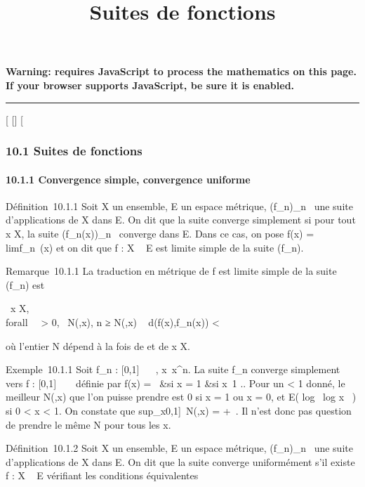 \documentclass[]{article}
\title{Suites de fonctions}
\author{}
\date{}
\begin{document}
\maketitle

\textbf{Warning: 
requires JavaScript to process the mathematics on this page.\\ If your
browser supports JavaScript, be sure it is enabled.}

\begin{center}\rule{3in}{0.4pt}\end{center}

{[}
{[}{]}
{[}

\subsubsection{10.1 Suites de fonctions}

\paragraph{10.1.1 Convergence simple, convergence uniforme}

Définition~10.1.1 Soit X un ensemble, E un espace métrique,
(f_n)_n\in{}~ une suite d'applications de X dans E. On dit
que la suite converge simplement si pour tout x \in X, la suite
(f_n(x))_n\in{}~ converge dans E. Dans ce cas, on pose
f(x) = limf_n~(x) et on dit que f : X
\rightarrow~ E est limite simple de la suite (f_n).

Remarque~10.1.1 La traduction en métrique de f est limite simple de la
suite (f_n) est

\forall~x \in X, \\forall~~\epsilon
\textgreater{} 0, \exists~N(\epsilon,x),\quad
n ≥ N(\epsilon,x) \rigtharrow~ d(f(x),f_n(x)) \textless{} \epsilon

où l'entier N dépend à la fois de \epsilon et de x \in X.

Exemple~10.1.1 Soit f_n : {[}0,1{]} \rightarrow~ ~,
x\mapsto~x^n. La suite f_n
converge simplement vers f : {[}0,1{]} \rightarrow~ ~ définie par f(x) =
\left \ &si x
= 1 &si x\neq~1 
\right .. Pour un \epsilon \textless{} 1 donné, le meilleur
N(\epsilon,x) que l'on puisse prendre est 0 si x = 1 ou x = 0, et E(
log~ \epsilon \over
log x~ ) si 0 \textless{} x \textless{} 1. On
constate que sup_x\in{[}0,1{]}~N(\epsilon,x) =
+\infty~. Il n'est donc pas question de prendre le même N pour tous les x.

Définition~10.1.2 Soit X un ensemble, E un espace métrique,
(f_n)_n\in{}~ une suite d'applications de X dans E. On dit
que la suite converge uniformément s'il existe f : X \rightarrow~ E vérifiant les
conditions équivalentes
\end{document}
